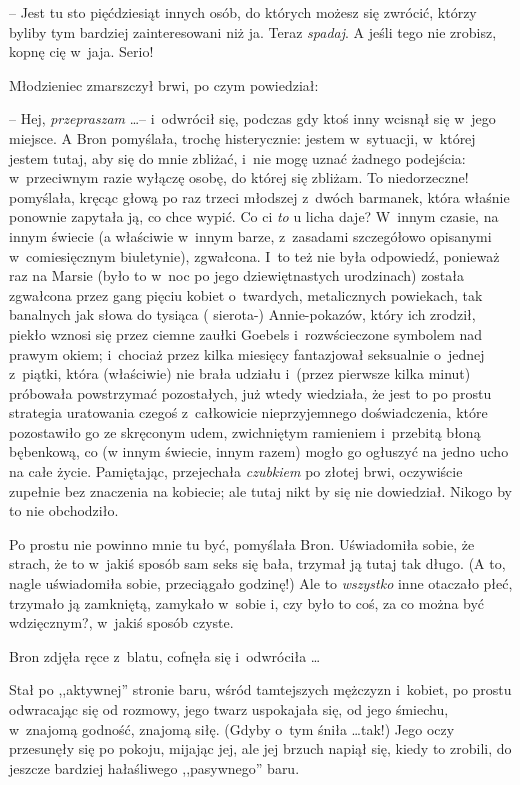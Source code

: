 \documentclass[oneside,polish,11pt,rmheadings]{mwbk}
\begin{document}
-- Jest tu sto pięćdziesiąt innych osób, do których możesz się zwrócić, którzy byliby tym bardziej zainteresowani niż ja. Teraz \textit{spadaj}. A jeśli tego nie zrobisz, kopnę cię w~jaja. Serio! 

Młodzieniec zmarszczył brwi, po czym powiedział: 

-- Hej, \textit{przepraszam } \ldots   -- i~odwrócił się, podczas gdy ktoś inny wcisnął się w~jego miejsce. A Bron pomyślała, trochę histerycznie: jestem w~sytuacji, w~której jestem tutaj, aby się do mnie zbliżać, i~nie mogę uznać żadnego podejścia: w~przeciwnym razie wyłączę osobę, do której się zbliżam. To niedorzeczne! pomyślała, kręcąc głową po raz trzeci młodszej z~dwóch barmanek, która właśnie ponownie zapytała ją, co chce wypić. Co ci \textit{to} u licha daje? W~innym czasie, na innym świecie (a właściwie w~innym barze, z~zasadami szczegółowo opisanymi w~comiesięcznym biuletynie), zgwałcona. I~to też nie była odpowiedź, ponieważ raz na Marsie (było to w~noc po jego dziewiętnastych urodzinach) została zgwałcona przez gang pięciu kobiet o~twardych, metalicznych powiekach, tak banalnych jak słowa do tysiąca ( sierota-) Annie-pokazów, który ich zrodził, piekło wznosi się przez ciemne zaułki Goebels i~rozwścieczone symbolem nad prawym okiem; i~chociaż przez kilka miesięcy fantazjował seksualnie o~jednej z~piątki, która (właściwie) nie brała udziału i~(przez pierwsze kilka minut) próbowała powstrzymać pozostałych, już wtedy wiedziała, że jest to po prostu strategia uratowania czegoś z~całkowicie  nieprzyjemnego doświadczenia, które pozostawiło go ze skręconym udem, zwichniętym ramieniem i~przebitą błoną bębenkową, co (w innym świecie, innym razem) mogło go ogłuszyć na jedno ucho na całe życie. Pamiętając, przejechała \textit{czubkiem }po złotej brwi, oczywiście zupełnie bez znaczenia na kobiecie; ale tutaj nikt by się nie dowiedział. Nikogo by to nie obchodziło. 

Po prostu nie powinno mnie tu być, pomyślała Bron. Uświadomiła sobie, że strach, że to w~jakiś sposób sam seks się bała, trzymał ją tutaj tak długo. (A to, nagle uświadomiła sobie, przeciągało godzinę!) Ale to \textit{wszystko }inne otaczało płeć, trzymało ją zamkniętą, zamykało w~sobie i, czy było to coś, za co można być wdzięcznym?, w~jakiś sposób czyste. 

Bron zdjęła ręce z~blatu, cofnęła się i~odwróciła \ldots  

Stał po ,,aktywnej'' stronie baru, wśród tamtejszych mężczyzn i~kobiet, po prostu odwracając się od rozmowy, jego twarz uspokajała się, od jego śmiechu, w~znajomą godność, znajomą siłę. (Gdyby o~tym śniła \ldots  tak!) Jego oczy przesunęły się po pokoju,  mijając jej, ale jej brzuch napiął się, kiedy to zrobili, do jeszcze bardziej hałaśliwego ,,pasywnego'' baru. 
\end{document}
